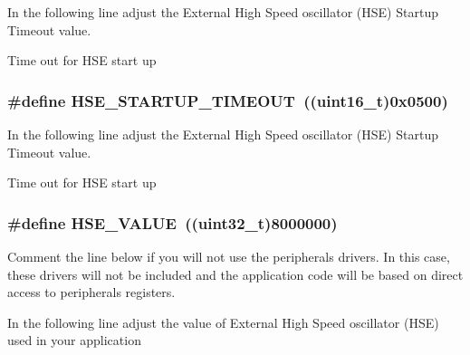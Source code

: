 In the following line adjust the External High Speed oscillator (H\-S\-E) Startup Timeout value. 

Time out for H\-S\-E start up \hypertarget{group___library__configuration__section_ga68ecbc9b0a1a40a1ec9d18d5e9747c4f}{
\subsubsection[{H\-S\-E\-\_\-\-S\-T\-A\-R\-T\-U\-P\-\_\-\-T\-I\-M\-E\-O\-U\-T}]{\setlength{\rightskip}{0pt plus 5cm}\#define H\-S\-E\-\_\-\-S\-T\-A\-R\-T\-U\-P\-\_\-\-T\-I\-M\-E\-O\-U\-T~((uint16\-\_\-t)0x0500)}}\label{group___library__configuration__section_ga68ecbc9b0a1a40a1ec9d18d5e9747c4f}


In the following line adjust the External High Speed oscillator (H\-S\-E) Startup Timeout value. 

Time out for H\-S\-E start up \hypertarget{group___library__configuration__section_gaeafcff4f57440c60e64812dddd13e7cb}{
\subsubsection[{H\-S\-E\-\_\-\-V\-A\-L\-U\-E}]{\setlength{\rightskip}{0pt plus 5cm}\#define H\-S\-E\-\_\-\-V\-A\-L\-U\-E~((uint32\-\_\-t)8000000)}}\label{group___library__configuration__section_gaeafcff4f57440c60e64812dddd13e7cb}


Comment the line below if you will not use the peripherals drivers. In this case, these drivers will not be included and the application code will be based on direct access to peripherals registers. 

In the following line adjust the value of External High Speed oscillator (H\-S\-E) used in your application

